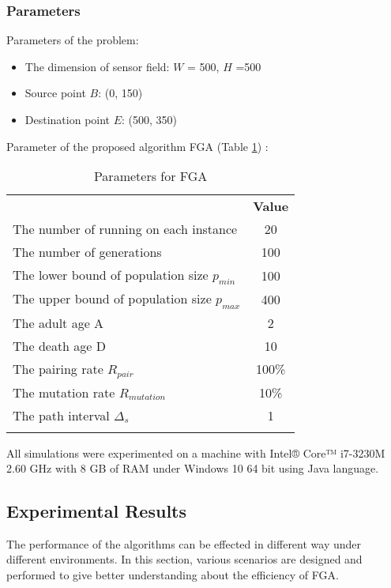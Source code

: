 \documentclass[final]{elsarticle}
\begin{document}
\subsubsection{Parameters}
Parameters of the problem:
\begin{itemize}
	\item The dimension of sensor field: $ W $ = 500, $ H $ =500
	\item Source point $ B $: (0, 150) 
	\item Destination point $ E $: (500, 350)	
\end{itemize}
Parameter of the proposed algorithm FGA (Table \ref{tab1}) :
\begin{table}
	\caption{Parameters for FGA}
	\label{tab1}       %
	\begin{center}
		\renewcommand{\arraystretch}{1.5}
		\begin{tabular}{lc}
			\hline\noalign{\smallskip}
			\multicolumn{1}{c}{\textbf{Parameter}} & \textbf{Value} \\
			\noalign{\smallskip}\hline\noalign{\smallskip}
			The number of running on each instance & 20 \\
			The number of generations & 100\\
			The lower bound of population size $ p_{min} $ & 100\\
			The upper bound of population size $ p_{max} $ & 400\\
			The adult age A & 2 \\
			The death age D & 10 \\
			The pairing rate $ R_{pair}$  & 100\% \\
			The mutation rate $ R_{mutation} $ & 10\% \\
			The path interval $\Delta_s$ & 1 \\ 
			\noalign{\smallskip} \hline
		\end{tabular}
	\end{center}
\end{table}
All simulations were experimented on a machine with Intel® Core™ i7-3230M 2.60 GHz with 8 GB of RAM under Windows 10 64 bit using Java language.


\subsection{Experimental Results}
The performance of the algorithms can be effected in different way under different environments. In this section, various scenarios are designed and performed to give better understanding about the efficiency of FGA.
\end{document}
